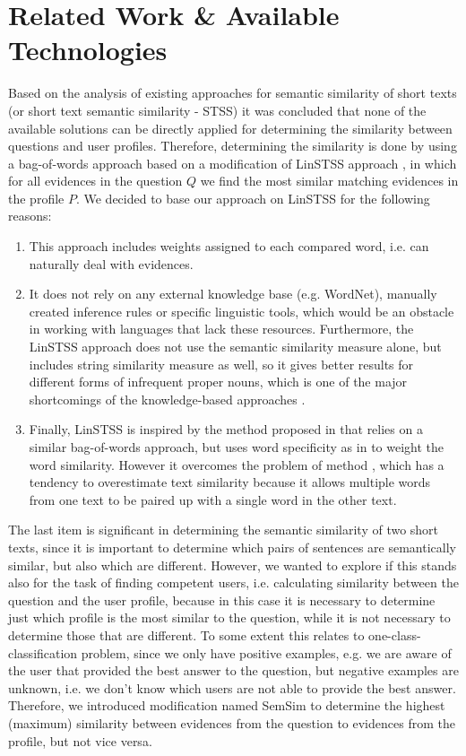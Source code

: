\documentclass[conference]{IEEEtran}
\begin{document}
\section{Related Work \& Available Technologies}
\label{sec:relatedwork}
Based on the analysis of existing approaches for semantic similarity of short texts (or short text semantic similarity - STSS) it was concluded that none of the available solutions can be directly applied for determining the similarity between questions and user profiles. Therefore, determining the similarity is done by using a bag-of-words approach based on a modification of LinSTSS approach \cite{bib:LinSTSS}, in which for all evidences in the question $Q$ we find the most similar matching evidences in the profile $P$. We decided to base our approach on LinSTSS for the following reasons:
\begin{enumerate}
	\item This approach includes weights assigned to each compared word, i.e. can naturally deal with evidences.
	\item It does not rely on any external knowledge base (e.g. WordNet), manually created inference rules or specific linguistic tools, which would be an obstacle in working with languages that lack these resources. Furthermore, the LinSTSS approach does not use the semantic similarity measure alone, but includes string similarity measure as well, so it gives better results for different forms of infrequent proper nouns, which is one of the major shortcomings of the knowledge-based approaches \cite{bib:JITA}.
	\item Finally, LinSTSS is inspired by the method proposed in \cite{bib:1} that relies on a similar bag-of-words approach, but uses word specificity as in \cite{bib:2} to weight the word similarity. However it overcomes the problem of method \cite{bib:2}, which has a tendency to overestimate text similarity because it allows multiple words from one text to be paired up with a single word in the other text.
\end{enumerate}	
The last item is significant in determining the semantic similarity of two short texts, since it is important to determine which pairs of sentences are semantically similar, but also which are different. However, we wanted to explore if this stands also for the task of finding competent users, i.e. calculating similarity between the question and the user profile, because in this case it is necessary to determine just which profile is the most similar to the question, while it is not necessary to determine those that are different. To some extent this relates to one-class-classification problem, since we only have positive examples, e.g. we are aware of the user that provided the best answer to the question, but negative examples are unknown, i.e. we don’t know which users are not able to provide the best answer. Therefore, we introduced modification named SemSim to determine the highest (maximum) similarity between evidences from the question to evidences from the profile, but not vice versa.
\end{document}
